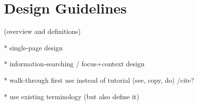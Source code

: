 \section{Design Guidelines}
(overview and definitions)

* single-page design

* information-searching / focus+context design

* walk-through first use instead of tutorial (see, copy, do) /cite{?}

* use existing terminology (but also define it)
